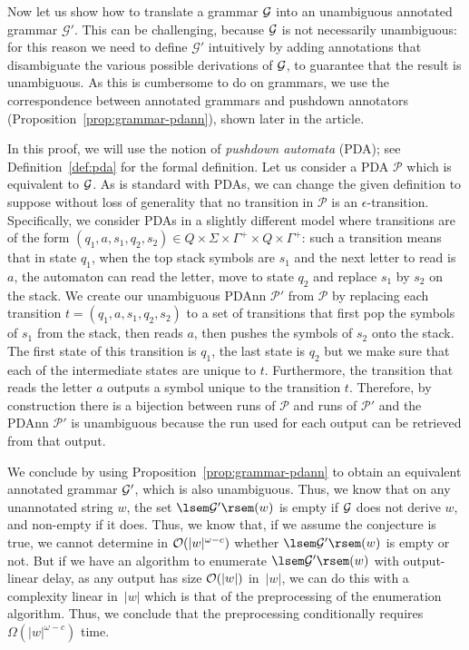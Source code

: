 Now let us show how to translate a grammar $\mathcal{G}$ into an
unambiguous annotated grammar $\mathcal{G}'$. This can be challenging, because
$\mathcal{G}$ is not necessarily unambiguous: for this reason we need to define
$\mathcal{G}'$ intuitively by adding annotations that disambiguate the various
possible derivations of $\mathcal{G}$, to guarantee that the result is
unambiguous. As this is cumbersome to do on grammars, we use the
correspondence between annotated grammars and pushdown annotators
(Proposition~\ref{prop:grammar-pdann}), shown later in the article. 

In this proof, we will use the notion of \emph{pushdown automata} (PDA); see
Definition~\ref{def:pda} for the formal definition.
Let us consider a PDA $\mathcal{P}$ 
which is equivalent to $\mathcal{G}$.
As is standard with PDAs, we can change the given definition to suppose without
loss of generality that no transition in $\mathcal{P}$ is an
$\epsilon$-transition. Specifically, we consider PDAs in a slightly different
model where transitions 
are of the form
$(q_1,a,s_1,q_2,s_2)\in Q\times \Sigma \times \Gamma^+ \times
Q \times \Gamma^+$: such a transition means that in state $q_1$, when the top
stack symbols are $s_1$ and the next letter to read is~$a$, the automaton can
read the letter, move to state
$q_2$ and replace $s_1$ by $s_2$ on the stack. We create our
unambiguous PDAnn $\mathcal{P}'$ from $\mathcal{P}$ by replacing
each transition $t=(q_1,a,s_1,q_2,s_2)$ to a set of transitions that
first pop the symbols of $s_1$ from the stack, then reads $a$, then
pushes the symbols of $s_2$ onto the stack. The first state of this
transition is $q_1$, the last state is $q_2$ but we make sure that
each of the intermediate states are unique to $t$. Furthermore, the
transition that reads the letter $a$ outputs a symbol unique to the
transition $t$. Therefore, by construction there is a bijection
between runs of $\mathcal{P}$ and runs of $\mathcal{P}'$ and the 
PDAnn $\mathcal{P}'$ is unambiguous because the run used for each
output can be retrieved from that output.

We conclude by using Proposition~\ref{prop:grammar-pdann} to obtain an equivalent annotated
grammar $\mathcal{G}'$, which is also unambiguous. Thus, we know that on any unannotated
string $w$, the set $\sem{\cG'}(w)$ is empty if $\mathcal{G}$ does not derive
$w$, and non-empty if it does. Thus, we know that, if we assume the conjecture is true, we cannot determine
in $\mathcal{O}(|w|^{\omega-c})$ whether $\sem{\cG'}(w)$ is empty or not. But if we have
an algorithm to enumerate $\sem{\cG'}(w)$  with output-linear delay, as any
output has size $\mathcal{O}(|w|)$ in~$|w|$, we can do this with a complexity linear in~$|w|$
which is that of the preprocessing of the enumeration algorithm. Thus, we
conclude that the preprocessing conditionally requires $\Omega(|w|^{\omega-c})$ time.

